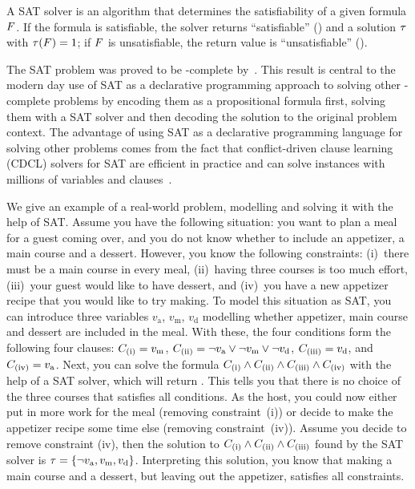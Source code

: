 A SAT solver is an algorithm that determines the satisfiability of a given formula $F$.
If the formula is satisfiable, the solver returns ``satisfiable'' (\sat{}) and a solution $\tau$ with $\tau(F)=1$;
if $F$ is unsatisfiable, the return value is ``unsatisfiable'' (\unsat{}).

The SAT problem was proved to be \NP-complete by~\textcite{DBLP:conf/stoc/Cook71}.
This result is central to the modern day use of SAT as a declarative programming approach to solving other \NP-complete problems by encoding them as a propositional formula first, solving them with a SAT solver and then decoding the solution to the original problem context.
The advantage of using SAT as a declarative programming language for solving other problems comes from the fact that conflict-driven clause learning (CDCL) solvers for SAT are efficient in practice and can solve instances with millions of variables and clauses~\autocite{handbook2-cdcl}.

\begin{example}\label{ex:sat-modelling}
  We give an example of a real-world problem, modelling and solving it with the help of SAT.
  Assume you have the following situation:
  you want to plan a meal for a guest coming over, and you do not know whether to include an appetizer, a main course and a dessert.
  However, you know the following constraints:
  (i)~there must be a main course in every meal, (ii)~having three courses is too much effort, (iii)~your guest would like to have dessert, and (iv)~you have a new appetizer recipe that you would like to try making.
  To model this situation as SAT, you can introduce three variables $v_\text{a}$, $v_\text{m}$, $v_\text{d}$ modelling whether appetizer, main course and dessert are included in the meal.
  With these, the four conditions form the following four clauses:
  $C_\text{(i)} = v_\text{m}$, $C_\text{(ii)} = \lnot v_\text{a} \lor \lnot v_\text{m} \lor \lnot v_\text{d}$, $C_\text{(iii)} = v_\text{d}$, and $C_\text{(iv)} = v_\text{a}$.
  Next, you can solve the formula $C_\text{(i)} \land C_\text{(ii)} \land C_\text{(iii)} \land C_\text{(iv)}$ with the help of a SAT solver, which will return \unsat{}.
  This tells you that there is no choice of the three courses that satisfies all conditions.
  As the host, you could now either put in more work for the meal (removing constraint~(i)) or decide to make the appetizer recipe some time else (removing constraint~(iv)).
  Assume you decide to remove constraint (iv), then the solution to $C_\text{(i)} \land C_\text{(ii)} \land C_\text{(iii)}$ found by the SAT solver is $\tau = \{ \lnot v_\text{a}, v_\text{m}, v_\text{d} \}$.
  Interpreting this solution, you know that making a main course and a dessert, but leaving out the appetizer, satisfies all constraints.
\end{example}

